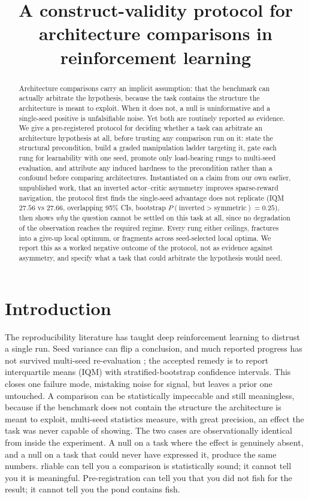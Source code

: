 \documentclass{article}
\title{A construct-validity protocol for architecture comparisons in reinforcement learning}
\begin{document}
\maketitle

\begin{abstract}
Architecture comparisons carry an implicit assumption: that the benchmark can actually
arbitrate the hypothesis, because the task contains the structure the architecture is meant
to exploit. When it does not, a
null is uninformative and a single-seed positive is unfalsifiable noise. Yet both are
routinely reported as evidence. We give a pre-registered protocol for deciding whether a
task can arbitrate an architecture hypothesis at all, before trusting any comparison run on
it: state the structural precondition, build a graded manipulation ladder targeting it, gate
each rung for learnability with one seed, promote only load-bearing rungs to multi-seed
evaluation, and attribute any induced hardness to the precondition rather than a confound
before comparing architectures. Instantiated on a claim from our own earlier, unpublished
work, that an inverted actor--critic asymmetry improves sparse-reward navigation, the
protocol first finds the single-seed advantage does not replicate (IQM $27.56$ vs $27.66$,
overlapping 95\% CIs, bootstrap $P(\text{inverted} > \text{symmetric}) = 0.25$), then shows \emph{why} the question cannot be settled on this
task at all, since no degradation of the observation reaches the required regime. Every rung
either ceilings, fractures into a give-up local optimum, or fragments across seed-selected
local optima. We report this as a worked negative outcome of the protocol, not as evidence
against asymmetry, and specify what a task that could arbitrate the hypothesis would need.
\end{abstract}

\section{Introduction}
\label{sec:intro}

The reproducibility literature has taught deep reinforcement learning to distrust a single
run. Seed variance can flip a conclusion, and much reported progress has not survived
multi-seed re-evaluation \citep{henderson2018matters,agarwal2021precipice}; the accepted
remedy is to report interquartile means (IQM) with stratified-bootstrap confidence intervals.
This closes one failure mode, mistaking noise for signal, but leaves a prior one untouched. A
comparison can be statistically impeccable and still meaningless, because if the benchmark
does not contain the structure the architecture is meant to exploit, multi-seed statistics
measure, with great precision, an effect the task was never capable of showing. The two cases
are observationally identical from inside the experiment. A null on a task where the effect is
genuinely absent, and a null on a task that could never have expressed it, produce the same
numbers. rliable can tell you a comparison is statistically sound; it cannot tell you it is
meaningful. Pre-registration can tell you that you did not fish for the result; it cannot tell
you the pond contains fish.
\end{document}
